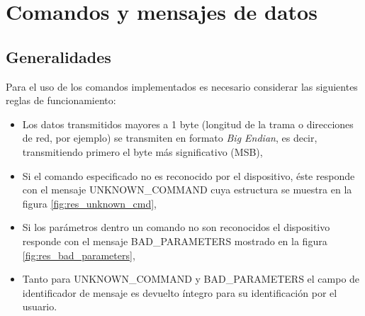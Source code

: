 \appendix

\chapter{Comandos y mensajes de datos}


\section{Generalidades}

Para el uso de los comandos implementados es necesario considerar las siguientes reglas de funcionamiento: 

\begin{itemize}
	\item Los datos transmitidos mayores a 1 byte (longitud de la trama o direcciones de red, por ejemplo) se transmiten en formato \textit{Big Endian}, es decir, transmitiendo primero el byte más significativo (MSB),
	\item Si el comando especificado no es reconocido por el dispositivo, éste responde con el mensaje UNKNOWN\_COMMAND cuya estructura se muestra en la figura \ref{fig:res_unknown_cmd}, 
	\item Si los parámetros dentro un comando no son reconocidos el dispositivo responde con el mensaje BAD\_PARAMETERS mostrado en la figura \ref{fig:res_bad_parameters}, 
	\item Tanto para UNKNOWN\_COMMAND y BAD\_PARAMETERS el campo de identificador de mensaje es devuelto íntegro para su identificación por el usuario. 
\end{itemize}

